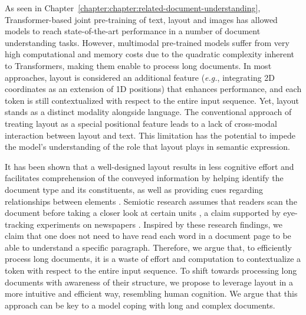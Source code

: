 As seen in Chapter~\ref{chapter:chapter:related-document-understanding}, Transformer-based joint pre-training of text, layout and images has allowed models to reach state-of-the-art performance in a number of document understanding tasks. However, multimodal pre-trained models suffer from very high computational and memory costs due to the quadratic complexity inherent to Transformers, making them enable to process long documents. In most approaches, layout is considered an additional feature (\textit{e.g.}, integrating 2D coordinates as an extension of 1D positions) that enhances performance, and each token is still contextualized with respect to the entire input sequence. Yet, layout stands as a distinct modality alongside language. The conventional approach of treating layout as a special positional feature leads to a lack of cross-modal interaction between layout and text. This limitation has the potential to impede the model's understanding of the role that layout plays in semantic expression.

It has been shown that a well-designed layout results in less cognitive effort \citep{britton1982effects, olive2017processing} and facilitates comprehension of the conveyed information by helping identify the document type and its constituents, as well as providing cues regarding relationships between elements \citep{wright1999psychology}. Semiotic research assumes that readers scan the document before taking a closer look at certain units \citep{kress1996reading}, a claim supported by eye-tracking experiments on newspapers \citep{leckner2012presentation}.  Inspired by these research findings, we claim that one does not need to have read each word in a document page to be able to understand a specific paragraph. Therefore, we argue that, to efficiently process long documents, it is a waste of effort and computation to contextualize a token with respect to the entire input sequence. To shift towards processing long documents with awareness of their structure, we propose to leverage layout in a more intuitive and efficient way, resembling human cognition. We argue that this approach can be key to a model coping with long and complex documents.

